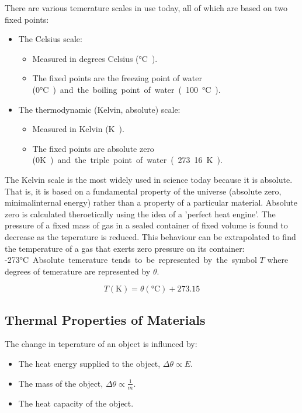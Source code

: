 \documentclass[a4,8pt]{article}
\begin{document}
There are various temerature scales in use today, all of which are based on two fixed points:

\begin{itemize}
	\item The Celsius scale:
		\begin{itemize}
			\item Measured in degrees Celsius (\si\celsius).
			\item The fixed points are the freezing point of water (0\si\celsius) and the boiling point of water (100\si\celsius).
		\end{itemize}
	\item The thermodynamic (Kelvin, absolute) scale:
		\begin{itemize}
			\item Measured in Kelvin (\si\kelvin).
			\item The fixed points are absolute zero (0\si\kelvin) and the triple point of water (273.16\si\kelvin). 
		\end{itemize}
\end{itemize}

The Kelvin scale is the most widely used in science today because it is absolute. That is, it is based on a fundamental property of the universe (absolute zero, minimalinternal energy) rather than a property of a particular material. Absolute zero is calculated theroetically using the idea of a 'perfect heat engine'. The pressure of a fixed mass of gas in a sealed container of fixed volume is found to decrease as the teperature is reduced. This behaviour can be extrapolated to find the temperature of a gas that exerts zero pressure on its container: -273\si\celsius. Absolute temerature tends to be represented by the symbol $T$ where degrees of temerature are represented by $\theta$.

$$T(\si\kelvin) = \theta(\si\celsius) + 273.15$$

\subsection{Thermal Properties of Materials}
The change in teperature of an object is influnced by:

\begin{itemize}
	\item The heat energy supplied to the object, $\Delta\theta \propto E$.
	\item The mass of the object, $\Delta\theta \propto \frac{1}{m}$.
	\item The heat capacity of the object.
\end{itemize}
\end{document}

